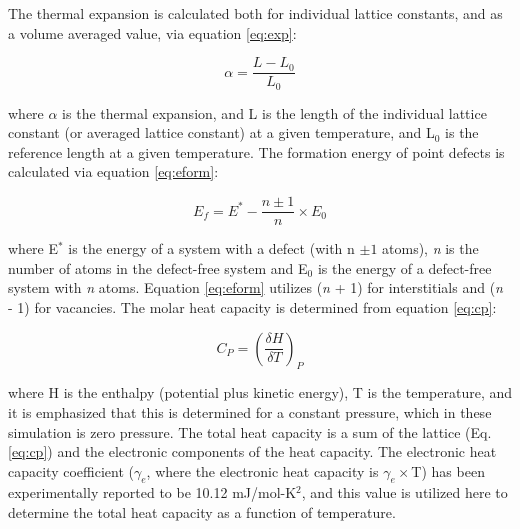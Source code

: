 \documentclass[review]{elsarticle}
\begin{document}
The thermal expansion is calculated both for individual lattice constants, and as a volume averaged value, via equation \ref{eq:exp}:

\begin{equation}
\label{eq:exp}
\alpha = \frac{L-L_0}{L_0} 
\end{equation}

where $\alpha$ is the thermal expansion, and L is the length of the individual lattice constant (or averaged lattice constant) at a given temperature, and L$_0$ is the reference length at a given temperature. The formation energy of point defects is calculated via equation \ref{eq:eform}: 

\begin{equation}
\label{eq:eform}
E_f = E^* - \frac{n \pm 1}{n} \times E_0
\end{equation}

where E$^{*}$ is the energy of a system with a defect (with n $\pm 1$ atoms), \textit{n} is the number of atoms in the defect-free system and E$_{0}$ is the energy of a defect-free system with \textit{n} atoms. Equation \ref{eq:eform} utilizes (\textit{n} + 1) for interstitials and (\textit{n} - 1) for vacancies. The molar heat capacity is determined from equation \ref{eq:cp}:

\begin{equation}
\label{eq:cp}
C_{P} = \left(\frac{\delta H}{\delta T}\right)_{P}
\end{equation}

where H is the enthalpy (potential plus kinetic energy), T is the temperature, and it is emphasized that this is determined for a constant pressure, which in these simulation is zero pressure. The total heat capacity is a sum of the lattice (Eq. \ref{eq:cp}) and the electronic components of the heat capacity. The electronic heat capacity coefficient ($\gamma_e$, where the electronic heat capacity is $\gamma_e\times$T) has been experimentally reported \cite{marchidan1976, schachinger1989} to be 10.12 mJ/mol-K$^2$, and this value is utilized here to determine the total heat capacity as a function of temperature. 
\end{document}
